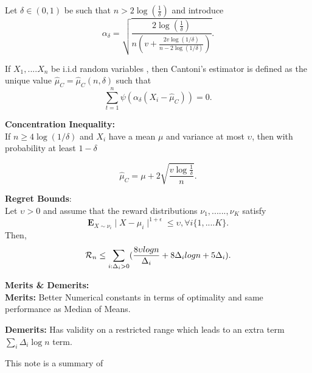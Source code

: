 \documentclass[11pt]{article}
\begin{document}
Let $\delta \in (0,1)$ be such that $n > 2\log(\frac{1}{\delta})$ and introduce 
$$\alpha_{\delta} = \sqrt{\frac{2\log(\frac{1}{\delta})}{n(v+ \frac{2v\log(1/\delta)}{n-2\log(1/\delta)})}}.$$

If $X_{1},....X_{n}$ be i.i.d random variables , then Cantoni's estimator is defined as the unique value $\hat\mu_{C} = \hat\mu_{C}(n,\delta)$ such that
$$\sum\limits^{n}_{t =1}\psi(\alpha_{\delta}(X_{i} - \hat\mu_{C})) = 0.$$

\noindent
\textbf{Concentration Inequality:}\\

If $n \geq 4\log(1/\delta)$ and $X_{i}$ have a mean $\mu$ and variance at most $\upsilon$, then with probability at least $1-\delta$

$$\hat\mu_{C} = \mu + 2\sqrt{\frac{v\log\frac{1}{\delta}}{n}} .$$

\noindent
\textbf{Regret Bounds}:\\
Let $\upsilon >0$ and assume that the reward distributions $\nu_{1} ,......,\nu_{K}$ satisfy
$$\mathbf{E}_{X\sim\nu_{i}}\mid X-\mu_{i} \mid^{1+\epsilon} \leq \upsilon ,\forall i  \{1,....K\}.$$
Then,
$$\mathcal{R}_{n} \leq \sum\limits_{i: \Delta_{i} >0} (\frac{8\upsilon logn}{\Delta_{i}} + 8\Delta_{i}logn + 5\Delta_{i}).$$

\noindent
\textbf{Merits \& Demerits:}\\

\textbf{Merits:} Better Numerical constants in terms of optimality and same performance as Median of Means.

\textbf{Demerits:} Has validity on a restricted range which leads to an extra term $\sum\limits_{i} \Delta_{i} \log n$ term.\\

\begin{flushleft}
This note is a summary of  \cite{bubeck2013bandits}
\end{flushleft}


\end{document}
